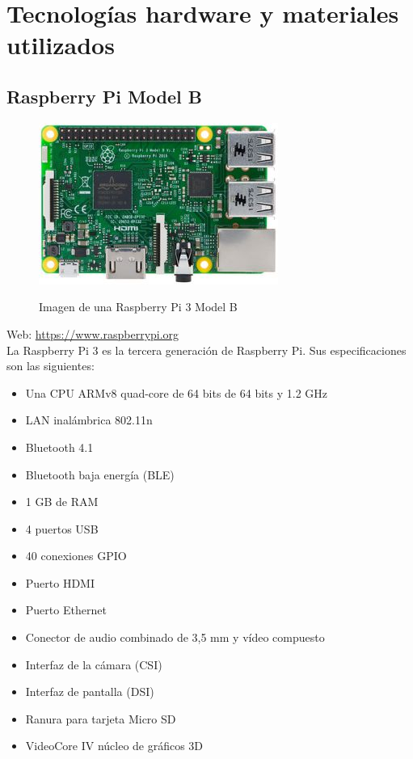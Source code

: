 \section{Tecnologías hardware y materiales utilizados}


\subsection{Raspberry Pi Model B}

\begin{figure}[H]
  \begin{center}
    \includegraphics[scale=0.5]{imagenes/raspberry-pi.jpg}\\
    \caption{Imagen de una Raspberry Pi 3 Model B}
  \end{center}
\end{figure}

Web: \url{https://www.raspberrypi.org}\\


La Raspberry Pi 3 es la tercera generación de Raspberry Pi. Sus especificaciones son las siguientes:

\begin{itemize}
 \item Una CPU ARMv8 quad-core de 64 bits de 64 bits y 1.2 GHz
 \item LAN inalámbrica 802.11n
 \item Bluetooth 4.1
 \item Bluetooth baja energía (BLE)
 \item 1 GB de RAM
 \item 4 puertos USB
 \item 40 conexiones GPIO
 \item Puerto HDMI
 \item Puerto Ethernet
 \item Conector de audio combinado de 3,5 mm y vídeo compuesto
 \item Interfaz de la cámara (CSI)
 \item Interfaz de pantalla (DSI)
 \item Ranura para tarjeta Micro SD
 \item VideoCore IV núcleo de gráficos 3D 
\end{itemize}


